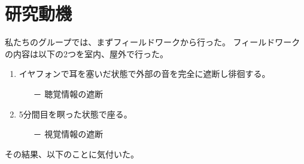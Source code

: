 \documentclass[12pt,a4paper]{report}
\begin{document}
\section{研究動機}
\noindent\space
私たちのグループでは、まずフィールドワークから行った。
フィールドワークの内容は以下の2つを室内、屋外で行った。
\begin{enumerate}
  \item イヤフォンで耳を塞いだ状態で外部の音を完全に遮断し徘徊する。
  \begin{itemize}\item[－] 聴覚情報の遮断\end{itemize}
  \item 5分間目を瞑った状態で座る。
  \begin{itemize}\item[－] 視覚情報の遮断\end{itemize}
\end{enumerate}
その結果、以下のことに気付いた。
\end{document}
